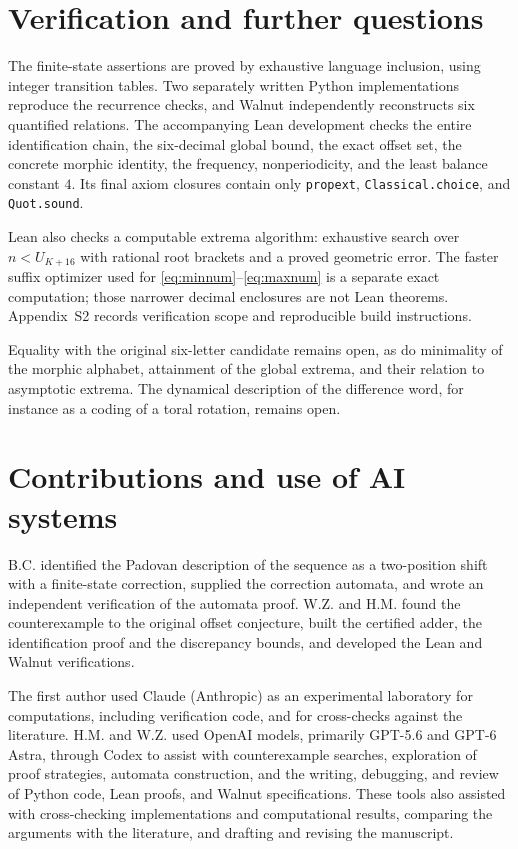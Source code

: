 \documentclass[11pt,a4paper]{article}
\numberwithin{equation}{section}
\theoremstyle{remark}
\newcommand{\code}[1]{\texttt{#1}}
\begin{document}
\section{Verification and further questions}\label{sec:verification}
The finite-state assertions are proved by exhaustive language inclusion,
using integer transition tables. Two separately written Python
implementations reproduce the recurrence checks, and Walnut independently
reconstructs six quantified relations. The accompanying Lean development
checks the entire identification chain, the six-decimal global bound,
the exact offset set, the concrete morphic identity, the frequency,
nonperiodicity, and the least balance constant $4$. Its final axiom closures
contain only \code{propext}, \code{Classical.choice}, and \code{Quot.sound}.

Lean also checks a computable extrema algorithm: exhaustive search over
$n<U_{K+16}$ with rational root brackets and a proved geometric error.
The faster suffix optimizer used for
\eqref{eq:minnum}--\eqref{eq:maxnum} is a separate exact computation;
those narrower decimal enclosures are not Lean theorems. Appendix~S2
records verification scope and reproducible build instructions.

Equality with the original six-letter candidate remains open, as do
minimality of the morphic alphabet, attainment of the global extrema,
and their relation to asymptotic extrema. The dynamical description of the
difference word, for instance as a coding of a toral rotation, remains open.

\section*{Contributions and use of AI systems}
\begingroup\small
B.C. identified the Padovan description of the sequence as a two-position
shift with a finite-state correction, supplied the correction automata, and
wrote an independent verification of the automata proof. W.Z. and H.M. found
the counterexample to the original offset conjecture, built the certified
adder, the identification proof and the discrepancy bounds, and developed
the Lean and Walnut verifications.

The first author used Claude (Anthropic)
as an experimental laboratory for computations, including verification code,
and for cross-checks against the literature. H.M. and W.Z. used OpenAI models,
primarily GPT-5.6 and GPT-6 Astra, through Codex to assist with counterexample
searches, exploration of proof strategies, automata construction, and the
writing, debugging, and review of Python code, Lean proofs, and Walnut
specifications. These tools also assisted with cross-checking implementations
and computational results, comparing the arguments with the literature,
and drafting and revising the manuscript.
\end{document}
